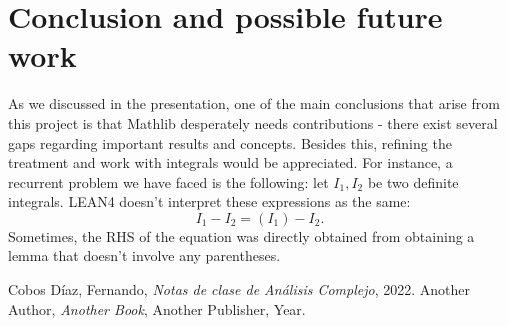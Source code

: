 \documentclass[a4paper,12pt]{article}
\begin{document}
\section{Conclusion and possible future work}
As we discussed in the presentation, one of the main conclusions that arise from this project is that
Mathlib desperately needs contributions - there exist several gaps regarding important results and concepts.
Besides this, refining the treatment and work with integrals would be appreciated. For instance, a recurrent problem
we have faced is the following: let $I_1, I_2$ be two definite integrals. LEAN4 doesn't interpret these expressions as the same:
$$I_1 - I_2 = (I_1) - I_2.$$
Sometimes, the RHS of the equation was directly obtained from obtaining a lemma that doesn't involve any parentheses.

\begin{thebibliography}{9}
 Cobos Díaz, Fernando, \textit{Notas de clase de Análisis Complejo}, 2022.
 Another Author, \textit{Another Book}, Another Publisher, Year.
\end{thebibliography}
\end{document}
